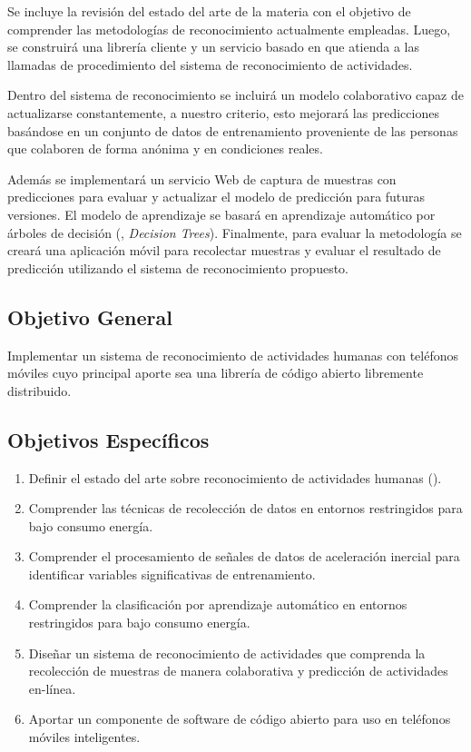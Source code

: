 Se incluye la revisión del estado del arte de la materia con el objetivo
de comprender las metodologías de reconocimiento actualmente empleadas.
Luego, se construirá una librería cliente y un servicio basado en
\emph{} que atienda a las llamadas de procedimiento
del sistema de reconocimiento de actividades. 

Dentro del sistema de reconocimiento se incluirá un modelo colaborativo
capaz de actualizarse constantemente, a nuestro criterio, esto mejorará
las predicciones basándose en un conjunto de datos de entrenamiento
proveniente de las personas que colaboren de forma anónima y en condiciones
reales.

Además se implementará un servicio Web de captura de muestras con
predicciones para evaluar y actualizar el modelo de predicción para
futuras versiones. El modelo de aprendizaje se basará en aprendizaje
automático por árboles de decisión (, \emph{Decision Trees}).
Finalmente, para evaluar la metodología se creará una aplicación móvil
para recolectar muestras y evaluar el resultado de predicción utilizando
el sistema de reconocimiento propuesto.

\subsection{Objetivo General}

\label{sec13:objetivo-general}

Implementar un sistema de reconocimiento de actividades humanas con
teléfonos móviles cuyo principal aporte sea una librería de código
abierto libremente distribuido.

\subsection{Objetivos Específicos}

\label{sec13:objetivos-especuxedficos}
\begin{enumerate}
\item \label{enu:obe1}Definir el estado del arte sobre reconocimiento de
actividades humanas (). 
\item \label{enu:obe2}Comprender las técnicas de recolección de datos en
entornos restringidos para bajo consumo energía. 
\item \label{enu:obe3}Comprender el procesamiento de señales de datos de
aceleración inercial para identificar variables significativas de
entrenamiento. 
\item \label{enu:obe4}Comprender la clasificación por aprendizaje automático
en entornos restringidos para bajo consumo energía. 
\item \label{enu:obe5}Diseñar un sistema de reconocimiento de actividades
que comprenda la recolección de muestras de manera colaborativa y
predicción de actividades en-línea. 
\item \label{enu:obe6}Aportar un componente de software de código abierto
para uso en teléfonos móviles inteligentes. 
\end{enumerate}

